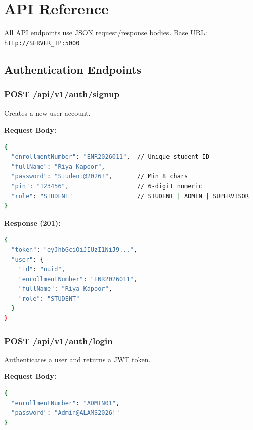 \chapter{API Reference}
\label{app:api}

All API endpoints use JSON request/response bodies. Base URL: \texttt{http://SERVER\_IP:5000}

\section{Authentication Endpoints}

\subsection{POST /api/v1/auth/signup}
Creates a new user account.

\textbf{Request Body:}
\begin{tcolorbox}[codebox, title={Request}]
\begin{lstlisting}[language=bash]
{
  "enrollmentNumber": "ENR2026011",  // Unique student ID
  "fullName": "Riya Kapoor",
  "password": "Student@2026!",       // Min 8 chars
  "pin": "123456",                   // 6-digit numeric
  "role": "STUDENT"                  // STUDENT | ADMIN | SUPERVISOR
}
\end{lstlisting}
\end{tcolorbox}

\textbf{Response (201):}
\begin{tcolorbox}[codebox, title={Response}]
\begin{lstlisting}[language=bash]
{
  "token": "eyJhbGciOiJIUzI1NiJ9...",
  "user": {
    "id": "uuid",
    "enrollmentNumber": "ENR2026011",
    "fullName": "Riya Kapoor",
    "role": "STUDENT"
  }
}
\end{lstlisting}
\end{tcolorbox}

\subsection{POST /api/v1/auth/login}
Authenticates a user and returns a JWT token.

\textbf{Request Body:}
\begin{tcolorbox}[codebox, title={Request}]
\begin{lstlisting}[language=bash]
{
  "enrollmentNumber": "ADMIN01",
  "password": "Admin@ALAMS2026!"
}
\end{lstlisting}
\end{tcolorbox}

